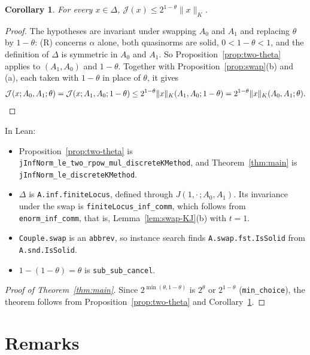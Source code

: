 \documentclass[11pt]{article}
\newtheorem{corollary}[theorem]{Corollary}
\theoremstyle{definition}
\theoremstyle{remark}
\newcommand{\norm}[2]{\lVert #1\rVert_{#2}}
\newcommand{\cJ}{\mathcal J}
\begin{document}
\begin{corollary}\label{cor:one-minus-theta}
  For every \(x \in \Delta\), \(\cJ(x) \le 2^{1-\theta}\norm{x}{K}\).
\end{corollary}

\begin{proof}
  The hypotheses are invariant under swapping \(A_0\) and \(A_1\) and replacing \(\theta\) by
  \(1-\theta\): (R) concerns \(\alpha\) alone, both quasinorms are solid,
  \(0 < 1-\theta < 1\), and the definition of \(\Delta\) is symmetric in \(A_0\) and \(A_1\).
  So Proposition~\ref{prop:two-theta} applies to \((A_1,A_0)\) and \(1-\theta\). Together with
  Proposition~\ref{prop:swap}(b) and (a), each taken with \(1-\theta\) in place of \(\theta\),
  it gives
  \[
    \cJ(x;A_0,A_1;\theta) = \cJ(x;A_1,A_0;1-\theta)
    \le 2^{1-\theta}\norm{x}{K}(A_1,A_0;1-\theta) = 2^{1-\theta}\norm{x}{K}(A_0,A_1;\theta).
    \qedhere
  \]
\end{proof}

In Lean:
\begin{itemize}
  \item Proposition~\ref{prop:two-theta} is \texttt{jInfNorm\_le\_two\_rpow\_mul\_discreteKMethod},
    and Theorem~\ref{thm:main} is \texttt{jInfNorm\_le\_discreteKMethod}.
  \item \(\Delta\) is \texttt{A.inf.finiteLocus}, defined through \(J(1,\cdot\,;A_0,A_1)\).
    Its invariance under the swap is \texttt{finiteLocus\_inf\_comm}, which follows from
    \texttt{enorm\_inf\_comm}, that is, Lemma~\ref{lem:swap-KJ}(b) with \(t = 1\).
  \item \texttt{Couple.swap} is an \texttt{abbrev}, so instance search finds
    \texttt{A.swap.fst.IsSolid} from \texttt{A.snd.IsSolid}.
  \item \(1 - (1 - \theta) = \theta\) is \texttt{sub\_sub\_cancel}.
\end{itemize}

\begin{proof}[Proof of Theorem~\ref{thm:main}]
  Since \(2^{\min(\theta,1-\theta)}\) is \(2^\theta\) or \(2^{1-\theta}\)
  (\texttt{min\_choice}), the theorem follows from Proposition~\ref{prop:two-theta} and
  Corollary~\ref{cor:one-minus-theta}.
\end{proof}

\section{Remarks}
\end{document}
